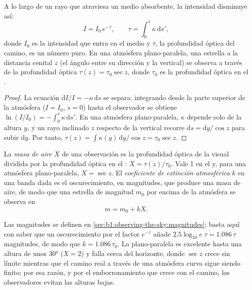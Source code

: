 \begin{proposition}\label{prop:b1:observing-the-sky:bouguer}
A lo largo de un rayo que atraviesa un medio absorbente, la intensidad disminuye así:
\[
  I = I_0\,e^{-\tau}, \qquad \tau = \int_0^s \kappa\,\mathrm ds' ,
\]
donde $I_0$ es la intensidad que entra en el medio y $\tau$, la profundidad óptica del
camino, es un número puro.
En una atmósfera plano-paralela, una estrella a la distancia cenital $z$ (el ángulo
entre su dirección y la vertical) se observa a través de la profundidad óptica
$\tau(z) = \tau_0\sec z$, donde $\tau_0$ es la profundidad óptica en el .
\end{proposition}

\begin{proof}
La ecuación $\mathrm dI/I = -\kappa\,\mathrm ds$ se separa: integrando desde la parte
superior de la atmósfera ($I = I_0$, $s = 0$) hasta el observador se obtiene
$\ln(I/I_0) = -\int_0^s\kappa\,\mathrm ds'$. En una atmósfera plano-paralela, $\kappa$
depende solo de la altura $y$, y un rayo inclinado $z$ respecto de la vertical recorre
$\mathrm ds = \mathrm dy/\cos z$ para subir $\mathrm dy$. Por tanto,
$\tau(z) = \int \kappa(y)\,\mathrm dy/\cos z = \tau_0\sec z$.
\end{proof}

\begin{definition}\label{def:b1:observing-the-sky:extinction}
La \emph{masa de aire} $X$ de una observación es la profundidad
óptica de la visual dividida por la profundidad óptica en el :
$X = \tau(z)/\tau_0$. Vale 1 en el  y, para una atmósfera plano-paralela,
$X = \sec z$. El \emph{coeficiente de extinción atmosférica}
$k$ en una banda dada es el oscurecimiento, en magnitudes, que produce una masa de aire,
de modo que una estrella de magnitud $m_0$ por encima de la atmósfera se observa en
\[
  m = m_0 + kX .
\]
\end{definition}

Las magnitudes se definen en \cref{sec:b1:observing-the-sky:magnitudes}; basta aquí con
saber que un oscurecimiento por el factor $e^{-\tau}$ añade
$2.5\log_{10}e\;\tau = 1.086\,\tau$ magnitudes, de modo que $k = 1.086\,\tau_0$.
La  plano-paralela es excelente hasta una altura de unos \ang{30} ($X = 2$)
y falla cerca del horizonte, donde $\sec z$ crece sin límite mientras que el camino real
a través de una atmósfera curva sigue siendo finito; por esa razón, y por el
emborronamiento que crece con el camino, los observadores evitan las alturas bajas.

